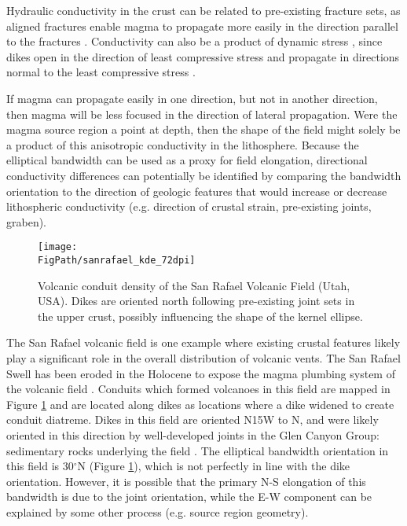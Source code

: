 Hydraulic conductivity in the crust can be related to pre-existing fracture sets, as aligned fractures enable magma to propagate more easily in the direction parallel to the fractures \citep{delaney1986field}. Conductivity can also be a product of dynamic stress \citep{germa2013tectonic}, since dikes open in the direction of least compressive stress and propagate in directions normal to the least compressive stress \citep{rubin1995propagation}. 

If magma can propagate easily in one direction, but not in another direction, then magma will be less focused in the direction of lateral propagation. Were the magma source region a point at depth, then the shape of the field might solely be a product of this anisotropic conductivity in the lithosphere. Because the elliptical bandwidth can be used as a proxy for field elongation, directional conductivity differences can potentially be identified by comparing the bandwidth orientation to the direction of geologic features that would increase or decrease lithospheric conductivity (e.g. direction of crustal strain, pre-existing joints, graben). 

\begin{figure}
\centering
\texttt{[image: \\FigPath/sanrafael\_kde\_72dpi]}
\caption[Volcanic conduit density of the San Rafael Volcanic Field (Utah, USA)]{Volcanic conduit density of the San Rafael Volcanic Field (Utah, USA). Dikes are oriented north following pre-existing joint sets in the upper crust, possibly influencing the shape of the kernel ellipse.}
\label{fig_sanrafaelkde}
\end{figure}

The San Rafael volcanic field is one example where existing crustal features likely play a significant role in the overall distribution of volcanic vents. The San Rafael Swell has been eroded in the Holocene to expose the magma plumbing system of the volcanic field \citep{richardson2015sills}. Conduits which formed volcanoes in this field are mapped in Figure \ref{fig_sanrafaelkde} and are located along dikes as locations where a dike widened to create conduit diatreme. Dikes in this field are oriented N15W to N, and were likely oriented in this direction by well-developed joints in the Glen Canyon Group: sedimentary rocks underlying the field \citep{delaney1997physical}. The elliptical bandwidth orientation in this field is 30$^{\circ}$N (Figure \ref{fig_sanrafaelkde}), which is not perfectly in line with the dike orientation. However, it is possible that the primary N-S elongation of this bandwidth is due to the joint orientation, while the E-W component can be explained by some other process (e.g. source region geometry).


